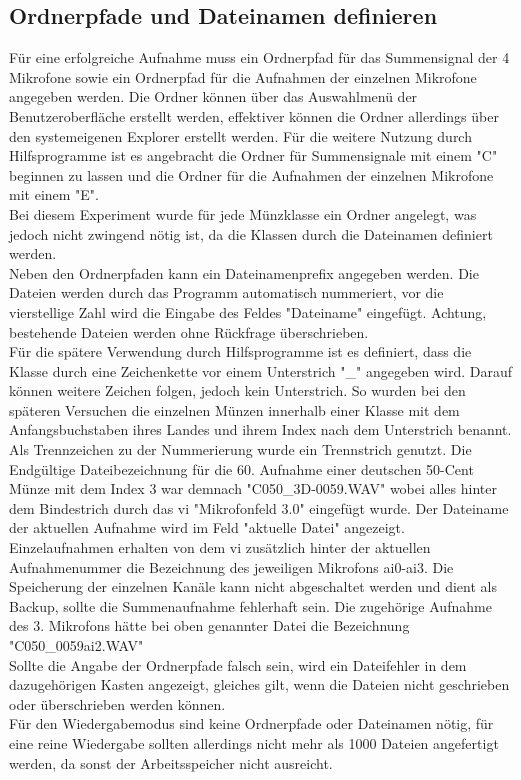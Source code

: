 \subsection{Ordnerpfade und Dateinamen definieren}

Für eine erfolgreiche Aufnahme muss ein Ordnerpfad für das Summensignal der 4 Mikrofone sowie ein Ordnerpfad für die Aufnahmen der einzelnen Mikrofone angegeben werden. Die Ordner können über das Auswahlmenü der Benutzeroberfläche erstellt werden, effektiver können die Ordner allerdings über den systemeigenen Explorer erstellt werden. Für die weitere Nutzung durch Hilfsprogramme ist es angebracht die Ordner für Summensignale mit einem "C" beginnen zu lassen und die Ordner für die Aufnahmen der einzelnen Mikrofone mit einem "E". \\
Bei diesem Experiment wurde für jede Münzklasse ein Ordner angelegt, was jedoch nicht zwingend nötig ist, da die Klassen durch die Dateinamen definiert werden. \\ Neben den Ordnerpfaden kann ein Dateinamenprefix angegeben werden. Die Dateien werden durch das Programm automatisch nummeriert, vor die vierstellige Zahl wird die Eingabe des Feldes "Dateiname" eingefügt. Achtung, bestehende Dateien werden ohne Rückfrage überschrieben. \\
Für die spätere Verwendung durch Hilfsprogramme ist es definiert, dass die Klasse durch eine Zeichenkette vor einem Unterstrich "\_" angegeben wird. Darauf können weitere Zeichen folgen, jedoch kein Unterstrich. So wurden bei den späteren Versuchen die einzelnen Münzen innerhalb einer Klasse mit dem Anfangsbuchstaben ihres Landes und ihrem Index nach dem Unterstrich benannt. Als Trennzeichen zu der Nummerierung wurde ein Trennstrich genutzt. Die Endgültige Dateibezeichnung für die 60. Aufnahme einer deutschen 50-Cent Münze mit dem Index 3 war demnach "C050\_3D-0059.WAV" wobei alles hinter dem Bindestrich durch das vi "Mikrofonfeld 3.0" eingefügt wurde. Der Dateiname der aktuellen Aufnahme wird im Feld "aktuelle Datei" angezeigt. \\
Einzelaufnahmen erhalten von dem vi zusätzlich hinter der aktuellen Aufnahmenummer die Bezeichnung des jeweiligen Mikrofons ai0-ai3. Die Speicherung der einzelnen Kanäle kann nicht abgeschaltet werden und dient als Backup, sollte die Summenaufnahme fehlerhaft sein. Die zugehörige Aufnahme des 3. Mikrofons hätte bei oben genannter Datei die Bezeichnung "C050\_0059ai2.WAV" \\
Sollte die Angabe der Ordnerpfade falsch sein, wird ein Dateifehler in dem dazugehörigen Kasten angezeigt, gleiches gilt, wenn die Dateien nicht geschrieben oder überschrieben werden können.\\
Für den Wiedergabemodus sind keine Ordnerpfade oder Dateinamen nötig, für eine reine Wiedergabe sollten allerdings nicht mehr als 1000 Dateien angefertigt werden, da sonst der Arbeitsspeicher nicht ausreicht.

